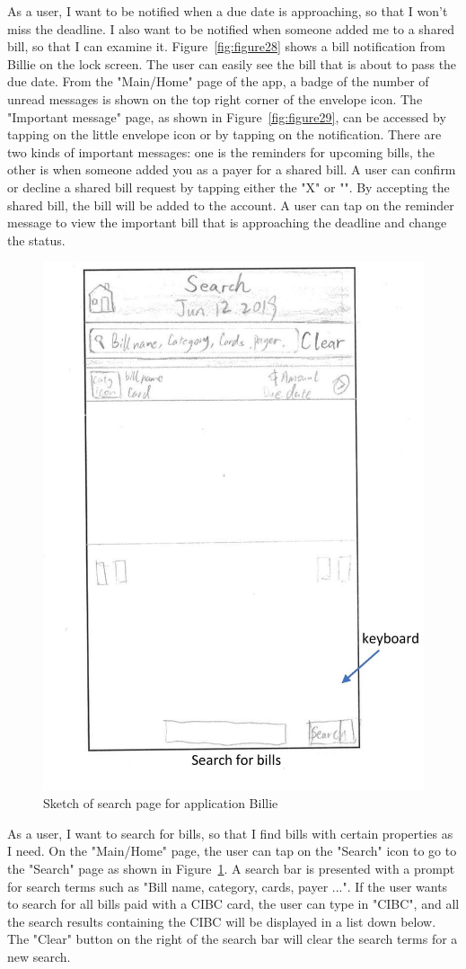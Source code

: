 \documentclass{sigchi}
\begin{document}
As a user, I want to be notified when a due date is approaching, so that I won't miss the deadline. I also want to be notified when someone added me to a shared bill, so that I can examine it. Figure~\ref{fig:figure28} shows a bill notification from Billie on the lock screen. The user can easily see the bill that is about to pass the due date. From the "Main/Home" page of the app, a badge of the number of unread messages is shown on the top right corner of the envelope icon. The "Important message" page, as shown in Figure~\ref{fig:figure29}, can be accessed by tapping on the little envelope icon or by tapping on the notification. There are two kinds of important messages: one is the reminders for upcoming bills, the other is when someone added you as a payer for a shared bill. A user can confirm or decline a shared bill request by tapping either the "X" or "\checkmark". By accepting the shared bill, the bill will be added to the account. A user can tap on the reminder message to view the important bill that is approaching the deadline and change the status.



\begin{figure}[h!]
\centering
  \includegraphics[width=0.6\columnwidth]{15-search-bill-page.jpg}
  \caption{Sketch of search page for application Billie}
  \label{fig:figure30}
\end{figure}
As a user, I want to search for bills, so that I find bills with certain properties as I need. On the "Main/Home" page, the user can tap on the "Search" icon to go to the "Search" page as shown in Figure~\ref{fig:figure30}. A search bar is presented with a prompt for search terms such as "Bill name, category, cards, payer ...". If the user wants to search for all bills paid with a CIBC card, the user can type in "CIBC", and all the search results containing the CIBC will be displayed in a list down below. The "Clear" button on the right of the search bar will clear the search terms for a new search.
\end{document}
